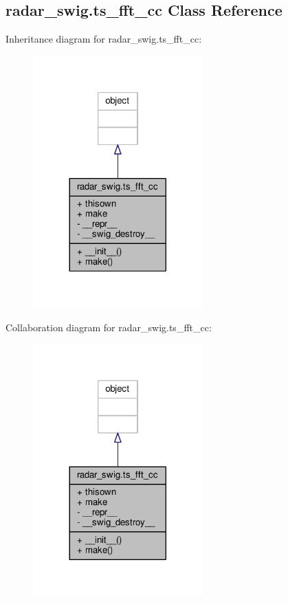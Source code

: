 \subsection{radar\+\_\+swig.\+ts\+\_\+fft\+\_\+cc Class Reference}
\label{classradar__swig_1_1ts__fft__cc}


Inheritance diagram for radar\+\_\+swig.\+ts\+\_\+fft\+\_\+cc\+:
\nopagebreak
\begin{figure}[H]
\begin{center}
\leavevmode
\includegraphics[width=185pt]{d0/d99/classradar__swig_1_1ts__fft__cc__inherit__graph}
\end{center}
\end{figure}


Collaboration diagram for radar\+\_\+swig.\+ts\+\_\+fft\+\_\+cc\+:
\nopagebreak
\begin{figure}[H]
\begin{center}
\leavevmode
\includegraphics[width=185pt]{dd/d25/classradar__swig_1_1ts__fft__cc__coll__graph}
\end{center}
\end{figure}
